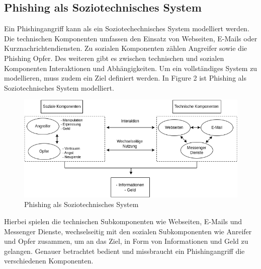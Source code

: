 \documentclass[journal=tosc,final]{iacrtrans}
\begin{document}
\subsection{Phishing als Soziotechnisches System}
Ein Phishingangriff kann als ein Soziotechechnisches System modelliert werden. Die technischen Komponenten umfassen den Einsatz von Webseiten, E-Mails oder Kurznachrichtendiensten. Zu sozialen Komponenten zählen Angreifer sowie die Phishing Opfer. Des weiteren gibt es zwischen technischen und sozialen Komponenten Interaktionen und Abhängigkeiten. Um ein vollständiges System zu modellieren, muss zudem ein Ziel definiert werden. In Figure 2 ist Phishing als Soziotechnisches System modelliert.
\begin{center}
 \begin{figure}[h]
  \caption{Phishing als Soziotechnisches System}
  \includegraphics[scale=0.5]{syst.png}
 \end{figure}
\end{center}
Hierbei spielen die technischen Subkomponenten wie Webseiten, E-Mails und Messenger Dienste, wechselseitig mit den sozialen Subkomponenten wie Anreifer und Opfer zusammen, um an das Ziel, in Form von Informationen und Geld zu gelangen. Genauer  betrachtet bedient und missbraucht ein Phishingangriff die verschiedenen Komponenten. 
\end{document}
